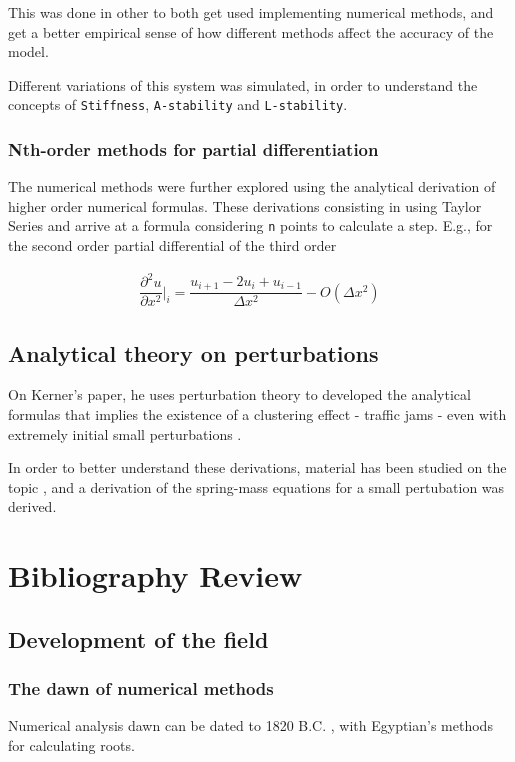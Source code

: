 \documentclass[12pt]{article}
\begin{document}
This was done in other to both get used implementing numerical methods, and get
a better empirical sense of how different methods affect the accuracy of the
model.

Different variations of this system was simulated, in order to understand the
concepts of \texttt{Stiffness}, \texttt{A-stability} and \texttt{L-stability}.

\subsubsection{Nth-order methods for partial differentiation}
\label{sec:orgbace7c4}
The numerical methods were further explored using the analytical derivation of
higher order numerical formulas. These derivations consisting in using Taylor
Series and arrive at a formula considering \texttt{n} points to calculate a step. E.g.,
for the second order partial differential of the third order

\begin{equation}
\begin{aligned}
\dfrac{\partial^2{u}}{\partial{x^2}}\biggr\rvert_i = \dfrac{u_{i+1}-2u_i+u_{i-1}}{\Delta{x^2}} - O(\Delta{x^2})
\end{aligned}
\end{equation}

\subsection{Analytical theory on perturbations}
\label{sec:org043d0f9}
On Kerner's paper, he uses perturbation theory to developed the analytical
formulas that implies the existence of a clustering effect - traffic jams - even
with extremely initial small perturbations \cite{kerner1993}.

In order to better understand these derivations, material has been studied on
the topic \cite{tremblay2017phy}, and a derivation of the spring-mass equations for a small pertubation
was derived.

\section{Bibliography Review}
\label{sec:orgb94241a}
\subsection{Development of the field}
\label{sec:orgb55d75d}
\subsubsection{The dawn of numerical methods}
\label{sec:org8f253cb}
Numerical analysis dawn can be dated to
1820 B.C. \cite{smith1930rhind}, with Egyptian's methods for
calculating roots.
\end{document}
